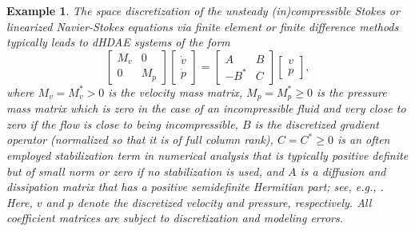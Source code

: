 \documentclass[11pt]{article}
\newtheorem{example}[theorem]{Example}
\begin{document}
\begin{example}\label{ex:stokes}
{\rm
The space discretization of the unsteady (in)compressible Stokes or linearized Navier-Stokes equations via finite element or finite difference methods typically leads to dHDAE systems of the form
%
\begin{equation}\label{P-instat-op-general}
\begin{bmatrix} M_v & 0 \\ 0 & M_p \end{bmatrix}
 \begin{bmatrix} \dot{v} \\ \dot{p} \end{bmatrix} =
\begin{bmatrix} A & B\\ -B^* & C\end{bmatrix}
\begin{bmatrix} v\\p\end{bmatrix},
\end{equation}
%
where $M_v=M^*_v>0$ is the velocity mass matrix, $M_p=M^*_p\geq 0$ is the pressure mass matrix which is zero  in the case of an  incompressible fluid and very close to zero if the flow is close to being incompressible,
$B$ is the discretized gradient operator (normalized so that it is of full column rank),  $C=C^*\geq 0$ is an often employed stabilization term in numerical analysis that is typically positive definite but of small norm or zero if no stabilization is used, and  $A$ is a diffusion and dissipation matrix that has a positive semidefinite Hermitian part; see, e.g., \cite{EmmM13}. Here, $v$ and $p$ denote the discretized velocity and pressure, respectively. All coefficient matrices are subject to discretization and modeling errors.}
\end{example}	
\end{document}
